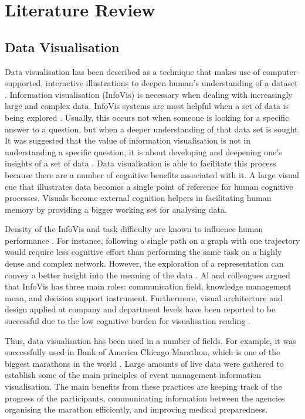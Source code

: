 \documentclass{l4proj}
\begin{document}
\chapter{Literature Review}

\section{Data Visualisation}

Data visualisation has been described as a technique that makes use of computer-supported, interactive illustrations to deepen human's understanding of a dataset \cite{card1999readings}. Information visualisation (InfoVis) is necessary when dealing with increasingly large and complex data. InfoVis systems are most helpful when a set of data is being explored \cite{fekete2008value}. Usually, this occurs not when someone is looking for a specific answer to a question, but when a deeper understanding of that data set is sought. It was suggested that the value of information visualisation is not in understanding a specific question, it is about developing and deepening one's insights of a set of data \cite{fekete2008value}. Data visualisation is able to facilitate this process because there are a number of cognitive benefits associated with it. A large visual cue that illustrates data becomes a single point of reference for human cognitive processes. Visuals become external cognition helpers in facilitating human memory by providing a bigger working set for analysing data. 

Density of the InfoVis and task difficulty are known to influence human performance \cite{netzel2014comparative}. For instance, following a single path on a graph with one trajectory would require less cognitive effort than performing the same task on a highly dense and complex network. However, the exploration of a representation can convey a better insight into the meaning of the data \cite{al2014information}. Al and colleagues \cite{al2014information} argued that InfoVis has three main roles: communication field, knowledge management mean, and decision support instrument. Furthermore, visual architecture and design applied at company and department levels have been reported to be successful due to the low cognitive burden for visualisation reading \cite{king2016cognitive}.

Thus, data visualisation has been used in a number of fields. For example, it was successfully used in Bank of America Chicago Marathon, which is one of the biggest marathons in the world \cite{hanken2016developing}. Large amounts of live data were gathered to establish some of the main principles of event management information visualisation. The main benefits from these practices are keeping track of the progress of the participants, communicating information between the agencies organising the marathon efficiently, and improving medical preparedness. 
\end{document}
